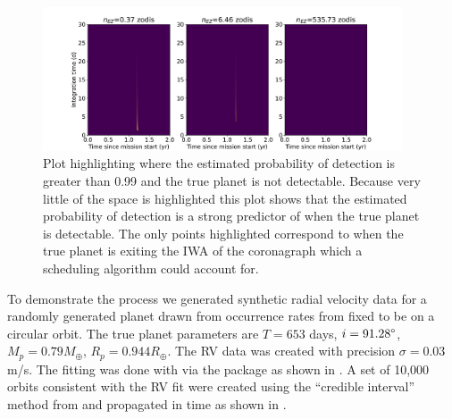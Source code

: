 \begin{figure}
  \begin{center}
    \includegraphics[width=0.95\textwidth]{ch3/figures/pdet_colored_true_err.pdf}
  \end{center}
  \caption{Plot highlighting where the estimated probability of detection is greater
  than 0.99 and the true planet is not detectable. Because very little of the space
  is highlighted this plot shows that the estimated probability of detection is a
  strong predictor of when the true planet is detectable. The only points highlighted
  correspond to when the true planet is exiting the IWA of the coronagraph which a
  scheduling algorithm could account for.}
  \label{fig:pdet_colored_true_err}
\end{figure}


To demonstrate the process we generated synthetic radial velocity data for a
randomly generated planet drawn from occurrence rates from
\citet{dulzJointRadialVelocity2020} fixed to be on a circular orbit. The true
planet parameters are $T=653$ days, $i=91.28\degree$, $M_p=0.79 M_\oplus$, $R_p
= 0.944 R_\oplus$. The RV data was created with precision $\sigma=0.03$ m/s.
The fitting was done with  \citep{fultonRadvelRadialVelocity2018}
via the  package \citep{rosenthalCaliforniaLegacy2021} as shown in . A set of 10,000 orbits consistent with the RV
fit were created using the ``credible interval'' method from  and
propagated in time as shown in .

